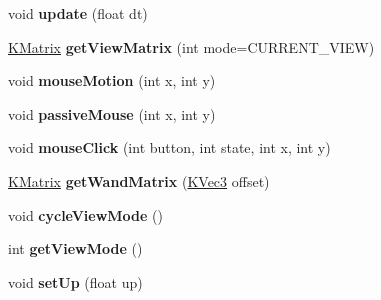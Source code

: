 \begin{DoxyCompactItemize}
\item 
\hypertarget{class_camera_controller_abf6fc6f47970b43fb27d8328c9cd79a8}{
void {\bfseries update} (float dt)}
\label{class_camera_controller_abf6fc6f47970b43fb27d8328c9cd79a8}

\item 
\hypertarget{class_camera_controller_a8b02f505367d3c88e947188859797195}{
\hyperlink{class_k_matrix}{KMatrix} {\bfseries getViewMatrix} (int mode=CURRENT\_\-VIEW)}
\label{class_camera_controller_a8b02f505367d3c88e947188859797195}

\item 
\hypertarget{class_camera_controller_abcb87066b7993ec625c1c4e3a98913d5}{
void {\bfseries mouseMotion} (int x, int y)}
\label{class_camera_controller_abcb87066b7993ec625c1c4e3a98913d5}

\item 
\hypertarget{class_camera_controller_a1015cfc5e03931341d3d360ea6bf66c9}{
void {\bfseries passiveMouse} (int x, int y)}
\label{class_camera_controller_a1015cfc5e03931341d3d360ea6bf66c9}

\item 
\hypertarget{class_camera_controller_a68b1ecbebfe385e7559692289ba0dd34}{
void {\bfseries mouseClick} (int button, int state, int x, int y)}
\label{class_camera_controller_a68b1ecbebfe385e7559692289ba0dd34}

\item 
\hypertarget{class_camera_controller_a644665a5212de05ec2e6c3a9408a7ee7}{
\hyperlink{class_k_matrix}{KMatrix} {\bfseries getWandMatrix} (\hyperlink{class_k_vec3}{KVec3} offset)}
\label{class_camera_controller_a644665a5212de05ec2e6c3a9408a7ee7}

\item 
\hypertarget{class_camera_controller_adbe1299029819c804a490a318a009c3c}{
void {\bfseries cycleViewMode} ()}
\label{class_camera_controller_adbe1299029819c804a490a318a009c3c}

\item 
\hypertarget{class_camera_controller_aa40e4569c5c788f06b2e1515d2603de9}{
int {\bfseries getViewMode} ()}
\label{class_camera_controller_aa40e4569c5c788f06b2e1515d2603de9}

\item 
\hypertarget{class_camera_controller_a79316729f2fa99f3ab8ad4bf85fbb2c0}{
void {\bfseries setUp} (float up)}
\label{class_camera_controller_a79316729f2fa99f3ab8ad4bf85fbb2c0}


\end{DoxyCompactItemize}
